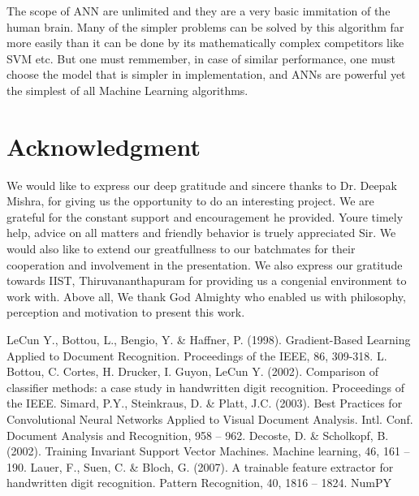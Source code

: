\documentclass[conference]{IEEEtran}
\begin{document}
The scope of ANN are unlimited and they are a very basic immitation of the human brain. Many of the simpler problems can be solved by this algorithm far more easily than it can be done by its mathematically complex competitors like SVM etc. But one must remmember, in case of similar performance, one must choose the model that is simpler in implementation, and ANNs are powerful yet the simplest of all Machine Learning algorithms.
\section*{Acknowledgment}
We would like to express our deep gratitude and sincere thanks to Dr. Deepak Mishra, for giving us the opportunity to do an interesting project. We are grateful for the constant support and encouragement he provided. Youre timely help, advice on all matters and friendly behavior is truely appreciated Sir. We would also like to extend our greatfullness to our batchmates for their cooperation and involvement in the presentation. \newline
We also express our gratitude towards IIST, Thiruvananthapuram for providing us a congenial environment to work with.\newline
Above all, We thank God Almighty who enabled us with philosophy, perception and motivation to present this work.\newline

\begin{thebibliography}{00}
 LeCun Y., Bottou, L., Bengio, Y. \& Haffner, P. (1998). Gradient-Based Learning Applied to Document Recognition. Proceedings of the IEEE, 86, 309-318.
 L. Bottou, C. Cortes, H. Drucker, I. Guyon, LeCun Y. (2002). Comparison of classifier methods: a case study in handwritten digit recognition. Proceedings of the IEEE.
 Simard, P.Y., Steinkraus, D. \& Platt, J.C. (2003). Best Practices for Convolutional Neural Networks Applied to Visual Document Analysis. Intl. Conf. Document Analysis and Recognition, 958 – 962.
 Decoste, D. \& Scholkopf, B. (2002). Training Invariant Support Vector Machines. Machine learning, 46, 161 – 190.
 Lauer, F., Suen, C. \& Bloch, G. (2007). A trainable feature extractor for handwritten digit recognition. Pattern Recognition, 40, 1816 – 1824.
 NumPY
\end{thebibliography}
\vspace{12pt}
\end{document}
